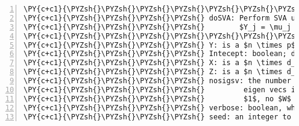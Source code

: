 \begin{Verbatim}[commandchars=\\\{\},codes={\catcode`\$=3\catcode`\^=7\catcode`\_=8},gobble=0,numbers=left,fontfamily=fvm,fontshape=n,fontsize=\footnotesize,tabsize=2]
\PY{c+c1}{\PYZsh{}\PYZsh{}\PYZsh{}\PYZsh{}\PYZsh{}\PYZsh{}\PYZsh{}\PYZsh{}\PYZsh{}\PYZsh{}\PYZsh{}\PYZsh{}\PYZsh{}\PYZsh{}\PYZsh{}\PYZsh{}\PYZsh{}\PYZsh{}\PYZsh{}\PYZsh{}\PYZsh{}\PYZsh{}\PYZsh{}\PYZsh{}\PYZsh{}\PYZsh{}\PYZsh{}\PYZsh{}\PYZsh{}\PYZsh{}\PYZsh{}\PYZsh{}\PYZsh{}\PYZsh{}\PYZsh{}\PYZsh{} FUNCTION \PYZsh{}\PYZsh{}\PYZsh{}\PYZsh{}\PYZsh{}\PYZsh{}\PYZsh{}\PYZsh{}\PYZsh{}\PYZsh{}\PYZsh{}\PYZsh{}\PYZsh{}\PYZsh{}\PYZsh{}\PYZsh{}\PYZsh{}\PYZsh{}\PYZsh{}\PYZsh{}\PYZsh{}\PYZsh{}\PYZsh{}\PYZsh{}\PYZsh{}\PYZsh{}\PYZsh{}\PYZsh{}\PYZsh{}\PYZsh{}\PYZsh{}\PYZsh{}}
\PY{c+c1}{\PYZsh{}\PYZsh{}\PYZsh{}\PYZsh{} doSVA: Perform SVA using the model:}
\PY{c+c1}{\PYZsh{}\PYZsh{}\PYZsh{}\PYZsh{}        $Y_j = \mu_j + X\alpha_j + Z\beta_j + W\delta_j + \mathbf{e}_j$}
\PY{c+c1}{\PYZsh{}\PYZsh{}\PYZsh{}\PYZsh{}\PYZsh{}\PYZsh{}\PYZsh{}\PYZsh{}\PYZsh{}\PYZsh{}\PYZsh{}\PYZsh{}\PYZsh{}\PYZsh{}\PYZsh{}\PYZsh{}\PYZsh{}\PYZsh{}\PYZsh{}\PYZsh{}\PYZsh{}\PYZsh{}\PYZsh{}\PYZsh{}\PYZsh{}\PYZsh{}\PYZsh{}\PYZsh{}\PYZsh{}\PYZsh{}\PYZsh{}\PYZsh{}\PYZsh{}\PYZsh{}\PYZsh{}\PYZsh{} INPUTS \PYZsh{}\PYZsh{}\PYZsh{}\PYZsh{}\PYZsh{}\PYZsh{}\PYZsh{}\PYZsh{}\PYZsh{}\PYZsh{}\PYZsh{}\PYZsh{}\PYZsh{}\PYZsh{}\PYZsh{}\PYZsh{}\PYZsh{}\PYZsh{}\PYZsh{}\PYZsh{}\PYZsh{}\PYZsh{}\PYZsh{}\PYZsh{}\PYZsh{}\PYZsh{}\PYZsh{}\PYZsh{}\PYZsh{}\PYZsh{}\PYZsh{}\PYZsh{}\PYZsh{}\PYZsh{}}
\PY{c+c1}{\PYZsh{}\PYZsh{}\PYZsh{}\PYZsh{} Y: is a $n \times p$ matrix, where each p columns are regressed}
\PY{c+c1}{\PYZsh{}\PYZsh{}\PYZsh{}\PYZsh{} Intecept: boolean; do we want to fit a mean value? (yes, in most cases)}
\PY{c+c1}{\PYZsh{}\PYZsh{}\PYZsh{}\PYZsh{} X: is a $n \times d_{\alpha}$ design matrix of the factors of interest}
\PY{c+c1}{\PYZsh{}\PYZsh{}\PYZsh{}\PYZsh{} Z: is a $n \times d_{\beta}$ design matrix of the incidental experimental factors}
\PY{c+c1}{\PYZsh{}\PYZsh{}\PYZsh{}\PYZsh{} nosigsv: the number (referred to as $H$ in some papers) of significant }
\PY{c+c1}{\PYZsh{}\PYZsh{}\PYZsh{}\PYZsh{}         eigen vecs if $NULL$, the function will determine. If less than }
\PY{c+c1}{\PYZsh{}\PYZsh{}\PYZsh{}\PYZsh{}         $1$, no $W$ computed}
\PY{c+c1}{\PYZsh{}\PYZsh{}\PYZsh{}\PYZsh{} verbose: boolean, whether the surragate variable matrix, $W$ is returned}
\PY{c+c1}{\PYZsh{}\PYZsh{}\PYZsh{}\PYZsh{} seed: an integer to feed into \PYZsq{}set.seed()\PYZsq{} for reproducable results}

\end{Verbatim}
